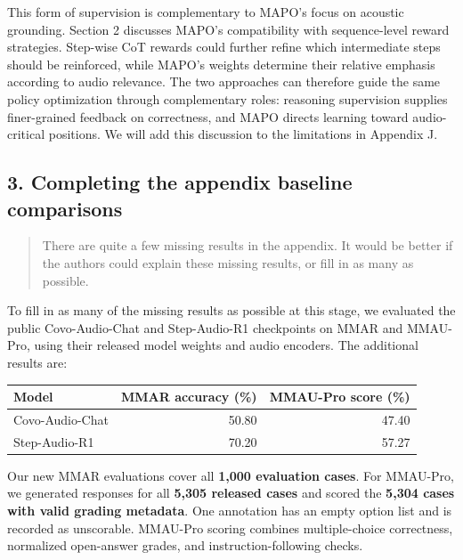 This form of supervision is complementary to MAPO's focus on acoustic grounding. Section 2 discusses MAPO's compatibility with sequence-level reward strategies. Step-wise CoT rewards could further refine which intermediate steps should be reinforced, while MAPO's weights determine their relative emphasis according to audio relevance. The two approaches can therefore guide the same policy optimization through complementary roles: reasoning supervision supplies finer-grained feedback on correctness, and MAPO directs learning toward audio-critical positions. We will add this discussion to the limitations in Appendix J.

\subsection*{3. Completing the appendix baseline comparisons}

\begin{quote}\small\color{ReviewQuote}
There are quite a few missing results in the appendix. It would be better if the authors could explain these missing results, or fill in as many as possible.

\end{quote}

To fill in as many of the missing results as possible at this stage, we evaluated the public Covo-Audio-Chat and Step-Audio-R1 checkpoints on MMAR and MMAU-Pro, using their released model weights and audio encoders. The additional results are:

\par\medskip
\begingroup
\small
\setlength{\tabcolsep}{5pt}
\renewcommand{\arraystretch}{1.2}
\noindent\begin{tabularx}{\linewidth}{@{}LRR@{}}
\toprule
\textbf{Model} & \textbf{MMAR accuracy (\%)} & \textbf{MMAU-Pro score (\%)} \\
\midrule
Covo-Audio-Chat & 50.80 & 47.40 \\
Step-Audio-R1 & 70.20 & 57.27 \\
\bottomrule
\end{tabularx}
\par\endgroup\medskip

Our new MMAR evaluations cover all \textbf{1,000 evaluation cases}. For MMAU-Pro, we generated responses for all \textbf{5,305 released cases} and scored the \textbf{5,304 cases with valid grading metadata}. One annotation has an empty option list and is recorded as unscorable. MMAU-Pro scoring combines multiple-choice correctness, normalized open-answer grades, and instruction-following checks.

